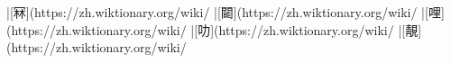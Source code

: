 |[冧](https://zh.wiktionary.org/wiki/%
|[𨶙](https://zh.wiktionary.org/wiki/%
|[哩](https://zh.wiktionary.org/wiki/%
|[叻](https://zh.wiktionary.org/wiki/%
|[靚](https://zh.wiktionary.org/wiki/%
